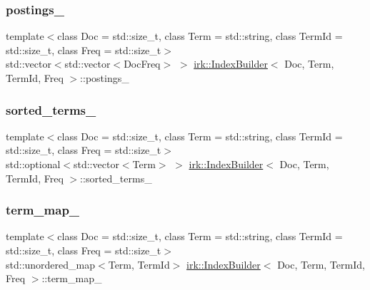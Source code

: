\mbox{\label{classirk_1_1IndexBuilder_ab1834f3af5506988bb30bf8722dd3655}} 
\subsubsection{\texorpdfstring{postings\+\_\+}{postings\_}}
{\footnotesize\ttfamily template$<$class Doc  = std\+::size\+\_\+t, class Term  = std\+::string, class Term\+Id  = std\+::size\+\_\+t, class Freq  = std\+::size\+\_\+t$>$ \\
std\+::vector$<$std\+::vector$<$Doc\+Freq$>$ $>$ \mbox{\hyperlink{classirk_1_1IndexBuilder}{irk\+::\+Index\+Builder}}$<$ Doc, Term, Term\+Id, Freq $>$\+::postings\+\_\+\hspace{0.3cm}{\ttfamily [protected]}}

\mbox{\label{classirk_1_1IndexBuilder_ae0643be514bd41bd60f48cf562ac0c43}} 
\subsubsection{\texorpdfstring{sorted\+\_\+terms\+\_\+}{sorted\_terms\_}}
{\footnotesize\ttfamily template$<$class Doc  = std\+::size\+\_\+t, class Term  = std\+::string, class Term\+Id  = std\+::size\+\_\+t, class Freq  = std\+::size\+\_\+t$>$ \\
std\+::optional$<$std\+::vector$<$Term$>$ $>$ \mbox{\hyperlink{classirk_1_1IndexBuilder}{irk\+::\+Index\+Builder}}$<$ Doc, Term, Term\+Id, Freq $>$\+::sorted\+\_\+terms\+\_\+\hspace{0.3cm}{\ttfamily [protected]}}

\mbox{\label{classirk_1_1IndexBuilder_a5d0bc3ee10185051faf082e22fb77410}} 
\subsubsection{\texorpdfstring{term\+\_\+map\+\_\+}{term\_map\_}}
{\footnotesize\ttfamily template$<$class Doc  = std\+::size\+\_\+t, class Term  = std\+::string, class Term\+Id  = std\+::size\+\_\+t, class Freq  = std\+::size\+\_\+t$>$ \\
std\+::unordered\+\_\+map$<$Term, Term\+Id$>$ \mbox{\hyperlink{classirk_1_1IndexBuilder}{irk\+::\+Index\+Builder}}$<$ Doc, Term, Term\+Id, Freq $>$\+::term\+\_\+map\+\_\+\hspace{0.3cm}{\ttfamily [protected]}}

